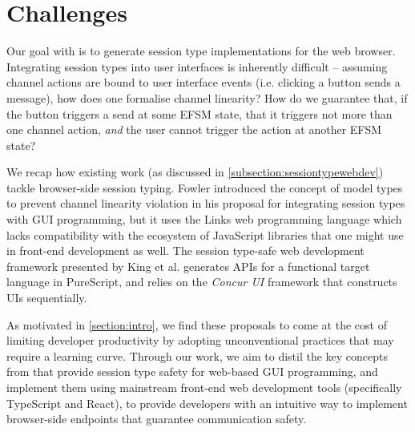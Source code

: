 \section{Challenges}
\label{section:reactchallenges}

Our goal with \reactcodegen is to
generate session type implementations for the web browser.
Integrating session types into user interfaces is inherently difficult --
assuming channel actions are bound to user interface events 
(i.e. clicking a button sends a message), how does one formalise
channel linearity? How do we guarantee that, if the button
triggers a send at some EFSM state, that it triggers not more than
one channel action, \textit{and} the user cannot trigger the action
at another EFSM state?

We recap how existing work 
(as discussed in \cref{subsection:sessiontypewebdev})
tackle browser-side session typing.
Fowler \cite{MVU2020} introduced the concept of model types to 
prevent
channel linearity violation in his proposal for
integrating session types with
GUI programming, but
it uses the Links web programming language \cite{LINKS} which
lacks compatibility with the ecosystem of JavaScript
libraries that one might use in front-end development as well.
The session type-safe web development framework presented
by King et al. \cite{PureScript2019} generates APIs for
a functional target language in PureScript, and relies on
the \textit{Concur UI} framework that constructs UIs sequentially.

As motivated in \cref{section:intro},
we find these proposals to come at the cost of
limiting developer productivity by adopting unconventional practices
that may require a learning curve.
Through our work, we aim to distil the key
concepts from \cite{MVU2020,LINKS,PureScript2019} 
that provide session type safety
for web-based GUI programming, and implement them using
mainstream front-end web development tools (specifically TypeScript
and React), to provide developers with an intuitive way to implement
browser-side endpoints that guarantee communication safety.